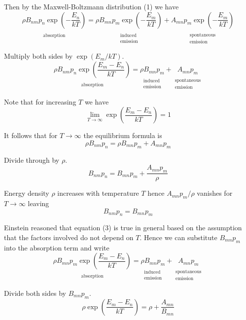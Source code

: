 \documentclass[12pt]{article}
\newcommand\BNM{B_{nm}} %
\newcommand\BMN{B_{mn}} %
\newcommand\AMN{A_{mn}} %
\newcommand\RHO{\rho}
\newcommand\ABSORPTION{\substack{\\[1ex] \text{absorption}}}
\newcommand\INDUCED{\substack{\\[1ex] \text{induced}\\ \text{emission}}}
\newcommand\SPONTANEOUS{\substack{\\[1ex] \text{spontaneous}\\ \text{emission}}}
\begin{document}
\noindent
Then by the Maxwell-Boltzmann distribution (1) we have
\begin{equation*}
\underset{\ABSORPTION}{\RHO\BNM p_n\exp\left(-\frac{E_n}{kT}\right)}
=\underset{\INDUCED}{\RHO\BMN p_m\exp\left(-\frac{E_m}{kT}\right)}
+\underset{\SPONTANEOUS}{\AMN p_m\exp\left(-\frac{E_m}{kT}\right)}
\tag{2}
\end{equation*}

\noindent
Multiply both sides by $\exp(E_m/kT)$.
\begin{equation*}
\underset{\ABSORPTION}{\RHO\BNM p_n\exp\left(\frac{E_m-E_n}{kT}\right)}
=\underset{\INDUCED}{\RHO\BMN p_m}
+\underset{\SPONTANEOUS}{\AMN p_m}
\end{equation*}

\noindent
Note that for increasing $T$ we have
\begin{equation*}
\lim_{T\rightarrow\infty}\exp\left(\frac{E_m-E_n}{kT}\right)=1
\end{equation*}

\noindent
It follows that for $T\rightarrow\infty$ the equilibrium formula is
\begin{equation*}
\RHO\BNM p_n
=\RHO\BMN p_m
+\AMN p_m
\end{equation*}

\noindent
Divide through by $\RHO$.
\begin{equation*}
\BNM p_n=\BMN p_m+\frac{\AMN p_m}{\RHO}
\end{equation*}

\noindent
Energy density $\RHO$ increases with temperature $T$
hence $\AMN p_m/\RHO$ vanishes for $T\rightarrow\infty$ leaving
\begin{equation*}
\BNM p_n=\BMN p_m
\tag{3}
\end{equation*}

\noindent
Einstein reasoned that equation (3) is true in general based on the assumption that
the factors involved do not depend on $T$.
Hence we can substitute $B_{mn}p_m$ into the absorption term and write
\begin{equation*}
\underset{\ABSORPTION}{\RHO\BMN p_m\exp\left(\frac{E_m-E_n}{kT}\right)}
=\underset{\INDUCED}{\RHO\BMN p_m}
+\underset{\SPONTANEOUS}{\AMN p_m}
\end{equation*}

\noindent
Divide both sides by $\BMN p_m$.
\begin{equation*}
\RHO\exp\left(\frac{E_m-E_n}{kT}\right)
=\RHO+\frac{\AMN}{\BMN}
\end{equation*}
\end{document}
